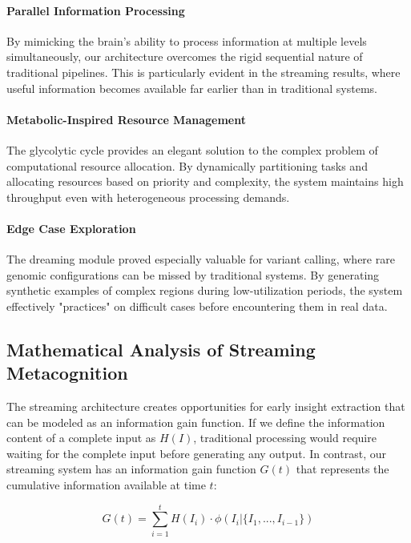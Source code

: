 \documentclass[11pt,a4paper,twocolumn]{article}
\begin{document}
\paragraph{Parallel Information Processing} By mimicking the brain's ability to process information at multiple levels simultaneously, our architecture overcomes the rigid sequential nature of traditional pipelines. This is particularly evident in the streaming results, where useful information becomes available far earlier than in traditional systems.

\paragraph{Metabolic-Inspired Resource Management} The glycolytic cycle provides an elegant solution to the complex problem of computational resource allocation. By dynamically partitioning tasks and allocating resources based on priority and complexity, the system maintains high throughput even with heterogeneous processing demands.

\paragraph{Edge Case Exploration} The dreaming module proved especially valuable for variant calling, where rare genomic configurations can be missed by traditional systems. By generating synthetic examples of complex regions during low-utilization periods, the system effectively "practices" on difficult cases before encountering them in real data.

\subsection{Mathematical Analysis of Streaming Metacognition}

The streaming architecture creates opportunities for early insight extraction that can be modeled as an information gain function. If we define the information content of a complete input as $H(I)$, traditional processing would require waiting for the complete input before generating any output. In contrast, our streaming system has an information gain function $G(t)$ that represents the cumulative information available at time $t$:

\begin{equation}
G(t) = \sum_{i=1}^{t} H(I_i) \cdot \phi(I_i|\{I_1,...,I_{i-1}\})
\end{equation}
\end{document}
